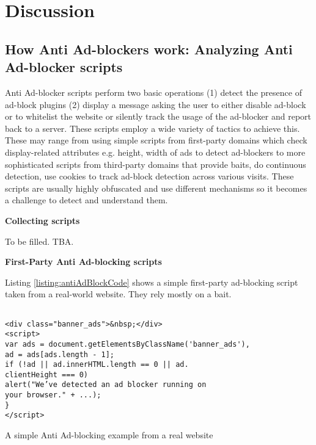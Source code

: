 \documentclass[runningheads,a4paper]{llncs}
\begin{document}
\section{Discussion}

\subsection{How Anti Ad-blockers work: Analyzing Anti Ad-blocker scripts}

Anti Ad-blocker scripts perform two basic operations (1) detect the presence of ad-block plugins (2) display a message asking the user to either disable ad-block or to whitelist the website or silently track the usage of the ad-blocker and report back to a server. These scripts employ a wide variety of tactics to achieve this. These may range from using simple scripts from first-party domains which check display-related attributes e.g. height, width of ads to detect ad-blockers to more sophisticated scripts from third-party domains that provide baits, do continuous detection, use cookies to track ad-block detection across various visits. These scripts are usually highly obfuscated and use different mechanisms so it becomes a challenge to detect and understand them.

\textbf{Collecting scripts}

To be filled. TBA.

\textbf{First-Party Anti Ad-blocking scripts}

Listing \ref{listing:antiAdBlockCode} shows a simple first-party ad-blocking script taken from a real-world website. They rely mostly on a bait.

\begin{listing}[!ht]
\begin{verbatim}
               
<div class="banner_ads">&nbsp;</div>
<script>
var ads = document.getElementsByClassName('banner_ads'),
ad = ads[ads.length - 1];
if (!ad || ad.innerHTML.length == 0 || ad.
clientHeight === 0)
alert("We’ve detected an ad blocker running on
your browser." + ...);
}
</script>
\end{verbatim}
\caption{A simple Anti Ad-blocking example from a real website}
\label{listing:antiAdBlockCode}
\end{listing}
\end{document}
